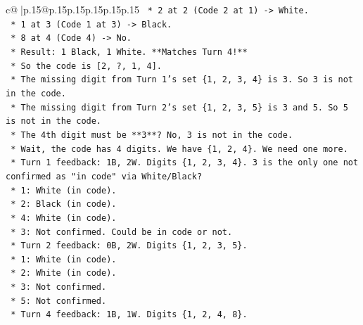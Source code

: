 \documentclass{article}
\begin{document}
{\begin{supertabular}{c@{$\;$}|p{.15\linewidth}@{}p{.15\linewidth}p{.15\linewidth}p{.15\linewidth}p{.15\linewidth}p{.15\linewidth}}
{{{\texttt{                                    *   2 at 2 (Code 2 at 1) {-}> White.} \\
\texttt{                                    *   1 at 3 (Code 1 at 3) {-}> Black.} \\
\texttt{                                    *   8 at 4 (Code 4) {-}> No.} \\
\texttt{                                    *   Result: 1 Black, 1 White. **Matches Turn 4!**} \\
\texttt{                                *   So the code is {[}2, ?, 1, 4{]}.} \\
\texttt{                                *   The missing digit from Turn 1's set \{1, 2, 3, 4\} is 3. So 3 is not in the code.} \\
\texttt{                                *   The missing digit from Turn 2's set \{1, 2, 3, 5\} is 3 and 5. So 5 is not in the code.} \\
\texttt{                                *   The 4th digit must be **3**? No, 3 is not in the code.} \\
\texttt{                                *   Wait, the code has 4 digits. We have \{1, 2, 4\}. We need one more.} \\
\texttt{                                *   Turn 1 feedback: 1B, 2W. Digits \{1, 2, 3, 4\}. 3 is the only one not confirmed as "in code" via White/Black?} \\
\texttt{                                    *   1: White (in code).} \\
\texttt{                                    *   2: Black (in code).} \\
\texttt{                                    *   4: White (in code).} \\
\texttt{                                    *   3: Not confirmed. Could be in code or not.} \\
\texttt{                                *   Turn 2 feedback: 0B, 2W. Digits \{1, 2, 3, 5\}.} \\
\texttt{                                    *   1: White (in code).} \\
\texttt{                                    *   2: White (in code).} \\
\texttt{                                    *   3: Not confirmed.} \\
\texttt{                                    *   5: Not confirmed.} \\
\texttt{                                *   Turn 4 feedback: 1B, 1W. Digits \{1, 2, 4, 8\}.} \\
}}}
\end{supertabular}}
\end{document}
